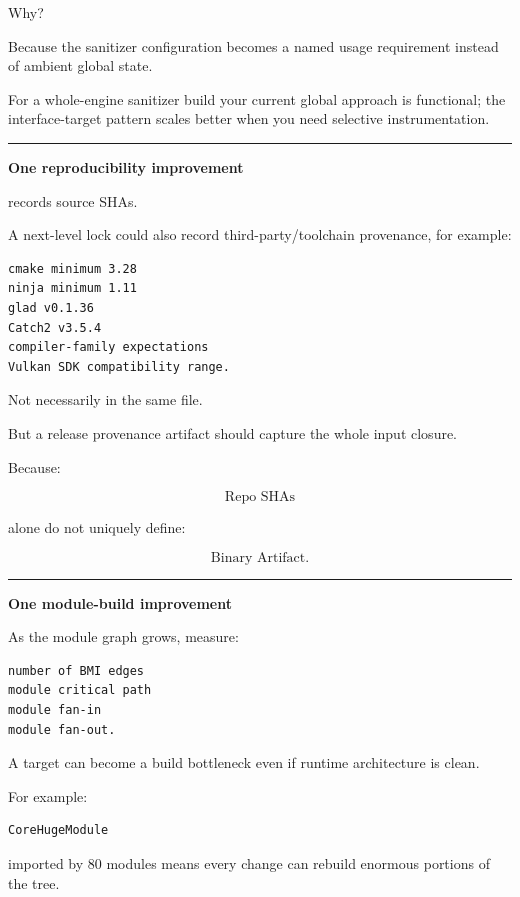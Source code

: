 Why?

Because the sanitizer configuration becomes a named usage requirement instead of ambient global state.

For a whole-engine sanitizer build your current global approach is functional; the interface-target pattern scales better when you need selective instrumentation.

\begin{center}\rule{0.5\linewidth}{0.5pt}\end{center}

\textbf{One reproducibility improvement}

 records source SHAs.

A next-level lock could also record third-party/toolchain provenance, for example:

\begin{verbatim}
cmake minimum 3.28
ninja minimum 1.11
glad v0.1.36
Catch2 v3.5.4
compiler-family expectations
Vulkan SDK compatibility range.
\end{verbatim}

Not necessarily in the same file.

But a release provenance artifact should capture the whole input closure.

Because:

\[
\text{Repo SHAs}
\]

alone do not uniquely define:

\[
\text{Binary Artifact}.
\]

\begin{center}\rule{0.5\linewidth}{0.5pt}\end{center}

\textbf{One module-build improvement}

As the module graph grows, measure:

\begin{verbatim}
number of BMI edges
module critical path
module fan-in
module fan-out.
\end{verbatim}

A target can become a build bottleneck even if runtime architecture is clean.

For example:

\begin{verbatim}
CoreHugeModule
\end{verbatim}

imported by 80 modules means every change can rebuild enormous portions of the tree.

